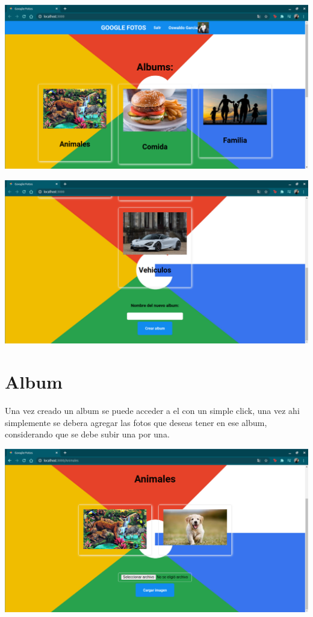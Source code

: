 \documentclass[12pt,a4paper]{article}
\begin{document}
\includegraphics[scale=0.20]{Inicio1}

\includegraphics[scale=0.20]{Inicio2}

\section{Album}
	Una vez creado un album se puede acceder a el con un simple click, una vez ahi simplemente se debera agregar las fotos que deseas tener en ese album, considerando que se debe subir una por una.

\includegraphics[scale=0.20]{Album}
\end{document}
